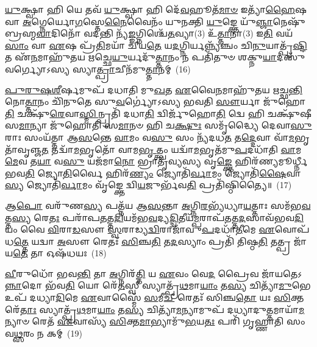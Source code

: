 \-\ul{𑌯𑍁}\-𑌕𑍍𑌷𑍍𑌵𑌾 𑌹𑌿 𑌯𑍇 𑌤𑌵᳴ \ul{𑌯𑍁}\-𑌕𑍍𑌷𑍍𑌵𑌾 𑌹𑌿 𑌦𑍇᳴\-\ul{𑌵}\-𑌹𑍂𑌤᳴\-\ul{𑌮𑌾}\-\-\ul{𑍞} 𑌇𑌤𑍍𑌯𑌾᳴\-\ul{𑌹𑍈}\-𑌷 𑌵𑌾 \ul{𑌅}\-𑌗𑍍𑌨𑍇𑌰𑍍𑌯𑍋\-\ul{𑌗}\-𑌸𑍍𑌤𑍇\-\ul{𑌨𑍈}\-𑌵𑍈𑌨𑌂᳴ 𑌯𑍁𑌨𑌕𑍍𑌤𑌿 \ul{𑌯𑍁}\-𑌙𑍍𑌕𑍍𑌤𑍇 𑌯𑍁᳴\-\ul{𑌞𑍍𑌜𑌾}\-𑌨𑍇𑌷𑍁᳴ 𑌬𑍍𑌰𑌹𑍍𑌮\-\ul{𑌵𑌾}\-𑌦𑌿𑌨𑍋᳴ 𑌵𑌦𑌨𑍍𑌤𑌿 𑌨𑍍𑌯᳴\-\ul{𑌙𑍍𑌙}\-𑌗𑍍𑌨𑌿𑌶𑍍𑌚𑍇᳴\-\ul{𑌤}\-𑌵𑍍𑌯𑌾(3) 𑌉᳴\-\ul{𑌤𑍍𑌤𑌾}\-𑌨𑌾(3) 𑌇\-\ul{𑌤𑌿} 𑌵𑌯᳴\-\ul{𑌸𑌾𑌂} 𑌵𑌾 \ul{𑌏}\-𑌷 𑌪𑍍𑌰᳴\-\ul{𑌤𑌿}\-𑌮𑌯𑌾᳴ 𑌚𑍀𑌯\-\ul{𑌤𑍇} 𑌯\-\ul{𑌦}\-𑌗𑍍𑌨𑌿𑌰𑍍𑌯𑌨𑍍𑌨𑍍𑌯᳴𑌞𑍍𑌚𑌂 𑌚𑌿\-\ul{𑌨𑍁}\-𑌯𑌾𑌤𑍍𑌪𑍃᳴\-\ul{𑌷𑍍𑌟𑌿}\-𑌤 𑌏᳴\-\ul{𑌨}\-𑌮𑌾𑌹𑍁᳴𑌤𑌯 𑌋𑌚𑍍𑌛𑍇\-\ul{𑌯𑍁}\-𑌰𑍍𑌯𑌦𑍁᳴\-\ul{𑌤𑍍𑌤𑌾}\-𑌨𑌂 𑌨 𑌪𑌤𑌿᳴𑌤𑍁𑍞 𑌶𑌕𑍍𑌨𑍁\-\ul{𑌯𑌾}\-𑌦𑌸𑍁᳴𑌵𑌰𑍍𑌗𑍍𑌯𑍋\-𑌽𑌸𑍍𑌯 𑌸𑍍𑌯𑌾\-\ul{𑌤𑍍𑌪𑍍𑌰𑌾}\-𑌚𑍀𑌨᳴𑌮𑍁\-\ul{𑌤𑍍𑌤𑌾}\-𑌨𑌮𑍍~(16)

\-\ul{𑌪𑍁}\-\-\ul{𑌰𑍁}\-\-\ul{𑌷}\-\-\ul{𑌶𑍀}\-𑌰𑍍\mbox{}𑌷𑌮𑍁𑌪᳴ 𑌦𑌧𑌾𑌤𑌿 𑌮𑍁\-\ul{𑌖}\-𑌤 \ul{𑌏}\-𑌵𑍈\-\ul{𑌨}\-𑌮𑌾𑌹𑍁᳴𑌤𑌯 𑌋𑌚𑍍𑌛\-\ul{𑌨𑍍𑌤𑌿} 𑌨𑍋\-\ul{𑌤𑍍𑌤𑌾}\-𑌨𑌂 𑌚𑌿᳴𑌨𑍁𑌤𑍇 𑌸𑍁\-\ul{𑌵}\-𑌰𑍍𑌗𑍍𑌯𑍋॑\-𑌽𑌸𑍍𑌯 𑌭𑌵𑌤𑌿 \ul{𑌸𑍗}\-𑌰𑍍𑌯𑌾 𑌜𑍁᳴𑌹𑍋\-\ul{𑌤𑌿} 𑌚𑌕𑍍𑌷𑍁᳴\-\ul{𑌰𑍇}\-𑌵𑌾\-\ul{𑌸𑍍𑌮𑌿}\-𑌨𑍍𑌪𑍍𑌰𑌤𑌿᳴ 𑌦𑌧𑌾\-\ul{𑌤𑌿} 𑌦𑍍𑌵𑌿𑌰𑍍𑌜𑍁᳴𑌹𑍋\-\ul{𑌤𑌿} 𑌦𑍍𑌵𑍇 𑌹𑌿 𑌚𑌕𑍍𑌷𑍁᳴𑌷𑍀 𑌸\-\ul{𑌮𑌾}\-𑌨𑍍𑌯𑌾 𑌜𑍁᳴𑌹𑍋𑌤𑌿 𑌸\-\ul{𑌮𑌾}\-𑌨𑍞 𑌹𑌿 𑌚\-\ul{𑌕𑍍𑌷𑍁𑌃} 𑌸𑌮𑍃᳴𑌦𑍍𑌧𑍍𑌯𑍈 𑌦𑍇𑌵𑌾\-\ul{𑌸𑍁}\-𑌰𑌾𑌃 𑌸𑌂𑌯᳴𑌤𑍍𑌤𑌾 𑌆\-\ul{𑌸}\-𑌨𑍍𑌤𑍇 \ul{𑌵𑌾}\-𑌮𑌂 𑌵\-\ul{𑌸𑍁} 𑌸𑌂 𑌨𑍍𑌯᳴𑌦𑌧\-\ul{𑌤} 𑌤\-\ul{𑌦𑍍𑌦𑍇}\-𑌵𑌾 𑌵𑌾᳴\-\ul{𑌮}\-𑌭𑍃𑌤𑌾᳴𑌵𑍃𑌞𑍍𑌜\-\ul{𑌤} 𑌤𑌦𑍍𑌵𑌾᳴\-\ul{𑌮}\-𑌭𑍃𑌤𑍋᳴ 𑌵𑌾𑌮\-\ul{𑌭𑍃}\-𑌤𑍍𑌤𑍍𑌵𑌂 𑌯𑌦𑍍𑌵𑌾᳴\-\ul{𑌮}\-𑌭𑍃𑌤᳴𑌮𑍁\-\ul{𑌪}\-𑌦𑌧𑌾᳴𑌤𑌿 \ul{𑌵𑌾}\-𑌮\-\ul{𑌮𑍇}\-𑌵 𑌤\-\ul{𑌯𑌾} 𑌵\-\ul{𑌸𑍁} 𑌯𑌜᳴𑌮𑌾\-\ul{𑌨𑍋} 𑌭𑍍𑌰𑌾𑌤𑍃᳴𑌵𑍍𑌯𑌸𑍍𑌯 𑌵𑍃\-\ul{𑌙𑍍𑌕𑍍𑌤𑍇} 𑌹𑌿𑌰᳴𑌣𑍍𑌯𑌮𑍂𑌰𑍍𑌧𑍍𑌨𑍀 𑌭𑌵\-\ul{𑌤𑌿} 𑌜𑍍𑌯𑍋\-\ul{𑌤𑌿}\-𑌰𑍍𑌵𑍈 𑌹𑌿𑌰᳴\-\ul{𑌣𑍍𑌯𑌂} 𑌜𑍍𑌯𑍋𑌤𑌿᳴\-\ul{𑌰𑍍𑌵𑌾}\-𑌮𑌂 𑌜𑍍𑌯𑍋𑌤𑌿᳴\-\ul{𑌷𑍈}\-𑌵𑌾\-\ul{𑌸𑍍𑌯} 𑌜𑍍𑌯𑍋𑌤𑌿᳴\-\ul{𑌰𑍍𑌵𑌾}\-𑌮𑌂 𑌵𑍃᳴𑌙𑍍𑌕𑍍𑌤𑍇 𑌦𑍍𑌵𑌿\-\ul{𑌯}\-𑌜𑍁𑌰𑍍𑌭᳴𑌵\-\ul{𑌤𑌿} 𑌪𑍍𑌰𑌤𑌿᳴𑌷𑍍𑌠𑌿𑌤𑍍𑌯𑍈॥~(17)

{\anuvakamend[{\-\ul{𑌯𑍁}\-\-\ul{𑌞𑍍𑌜𑌾}\-𑌨𑍇𑌷𑍍𑌵𑌗𑍍𑌨𑍇॑ \ul{𑌪𑍍𑌰𑌾}\-𑌚𑍀𑌨᳴𑌮𑍁\-\ul{𑌤𑍍𑌤𑌾}\-𑌨𑌂 𑌵𑌾᳴\-\ul{𑌮}\-𑌭𑍃\-\ul{𑌤}\-𑌞𑍍𑌚𑌤𑍁᳴𑌰𑍍𑌵𑌿𑍞𑌶𑌤𑌿𑌶𑍍𑌚}]}%

𑌆\-\ul{𑌪𑍋} 𑌵𑌰𑍁᳴𑌣\-\ul{𑌸𑍍𑌯} 𑌪𑌤𑍍𑌨᳴𑌯 𑌆\-\ul{𑌸}\-𑌨𑍍𑌤𑌾 \ul{𑌅}\-𑌗𑍍𑌨𑌿\-\ul{𑌰}\-𑌭𑍍𑌯᳴𑌧𑍍𑌯𑌾\-\ul{𑌯}\-𑌤𑍍𑌤𑌾𑌃 𑌸𑌮᳴𑌭\-\ul{𑌵}\-𑌤𑍍𑌤\-\ul{𑌸𑍍𑌯} 𑌰𑍇\-\ul{𑌤𑌃} 𑌪𑌰𑌾᳴𑌪\-\ul{𑌤}\-𑌤𑍍𑌤\-\ul{𑌦𑌿}\-𑌯𑌮᳴𑌭\-\ul{𑌵}\-𑌦𑍍𑌯\-\ul{𑌦𑍍𑌦𑍍𑌵𑌿}\-𑌤𑍀𑌯᳴\-\ul{𑌮𑍍𑌪}\-𑌰𑌾𑌪᳴\-\ul{𑌤}\-𑌤𑍍𑌤\-\ul{𑌦}\-𑌸𑌾\-𑌵᳴𑌭𑌵\-\ul{𑌦𑌿}\-𑌯𑌂 𑌵𑍈 \ul{𑌵𑌿}\-𑌰𑌾\-\ul{𑌡}\-𑌸𑍗 \ul{𑌸𑍍𑌵}\-𑌰𑌾𑌡𑍍𑌯\-\ul{𑌦𑍍𑌵𑌿}\-𑌰𑌾𑌜𑌾᳴𑌵𑍁\-\ul{𑌪}\-𑌦𑌧𑌾᳴\-\ul{𑌤𑍀}\-𑌮𑍇 \ul{𑌏}\-𑌵𑍋𑌪᳴ 𑌧\-\ul{𑌤𑍍𑌤𑍇} 𑌯𑌦𑍍𑌵𑌾 \ul{𑌅}\-𑌸𑍗 𑌰𑍇𑌤𑌃᳴ \ul{𑌸𑌿}\-𑌞𑍍𑌚\-\ul{𑌤𑌿} 𑌤\-\ul{𑌦}\-𑌸𑍍𑌯𑌾𑌂 𑌪𑍍𑌰𑌤𑌿᳴ 𑌤𑌿𑌷𑍍𑌠\-\ul{𑌤𑌿} 𑌤𑌤𑍍𑌪𑍍𑌰 𑌜𑌾᳴𑌯\-\ul{𑌤𑍇} 𑌤𑌾 𑌓𑌷᳴𑌧𑌯𑌃~(18)

\-\ul{𑌵𑍀}\-𑌰𑍁𑌧𑍋᳴ 𑌭𑌵\-\ul{𑌨𑍍𑌤𑌿} 𑌤𑌾 \ul{𑌅}\-𑌗𑍍𑌨𑌿𑌰᳴\-\ul{𑌤𑍍𑌤𑌿} 𑌯 \ul{𑌏}\-𑌵𑌂 𑌵𑍇\-\ul{𑌦} 𑌪𑍍𑌰𑍈𑌵 𑌜𑌾᳴𑌯𑌤𑍇\-𑌽\-\ul{𑌨𑍍𑌨𑌾}\-𑌦𑍋 𑌭᳴𑌵\-\ul{𑌤𑌿} 𑌯𑍋 𑌰𑍇᳴\-\ul{𑌤}\-𑌸𑍍𑌵𑍀 𑌸𑍍𑌯𑌾𑌤𑍍𑌪𑍍𑌰᳴\-\ul{𑌥}\-𑌮𑌾\-\ul{𑌯𑌾𑌂} 𑌤\-\ul{𑌸𑍍𑌯} 𑌚𑌿𑌤𑍍𑌯𑌾᳴\-\ul{𑌮𑍁}\-𑌭𑍇 𑌉𑌪᳴ 𑌦𑌧𑍍𑌯𑌾\-\ul{𑌦𑌿}\-𑌮𑍇 \ul{𑌏}\-𑌵𑌾𑌸𑍍𑌮𑍈᳴ \ul{𑌸}\-𑌮𑍀\-\ul{𑌚𑍀} 𑌰𑍇𑌤𑌃᳴ 𑌸𑌿𑌞𑍍𑌚\-\ul{𑌤𑍋} 𑌯𑌃 \ul{𑌸𑌿}\-𑌕𑍍𑌤𑌰𑍇᳴\-\ul{𑌤𑌾𑌃} 𑌸𑍍𑌯𑌾𑌤𑍍𑌪𑍍𑌰᳴\-\ul{𑌥}\-𑌮𑌾\-\ul{𑌯𑌾𑌂} 𑌤\-\ul{𑌸𑍍𑌯} 𑌚𑌿𑌤𑍍𑌯𑌾᳴\-\ul{𑌮}\-𑌨𑍍𑌯𑌾𑌮𑍁𑌪᳴ 𑌦𑌧𑍍𑌯𑌾𑌦𑍁\-\ul{𑌤𑍍𑌤}\-𑌮𑌾𑌯𑌾᳴\-\-\ul{𑌮}\-𑌨𑍍𑌯𑌾𑍞 𑌰𑍇𑌤᳴ \ul{𑌏}\-𑌵𑌾𑌸𑍍𑌯᳴ \ul{𑌸𑌿}\-𑌕𑍍𑌤\-\ul{𑌮𑌾}\-𑌭𑍍𑌯𑌾𑌮𑍁᳴\-\ul{𑌭}\-𑌯\-\ul{𑌤𑌃} 𑌪𑌰𑌿᳴ 𑌗𑍃𑌹𑍍𑌣𑌾𑌤𑌿 𑌸𑌂𑌵\-\ul{𑌥𑍍𑌸}\-𑌰𑌂 𑌨 𑌕𑌮𑍍~(19)

